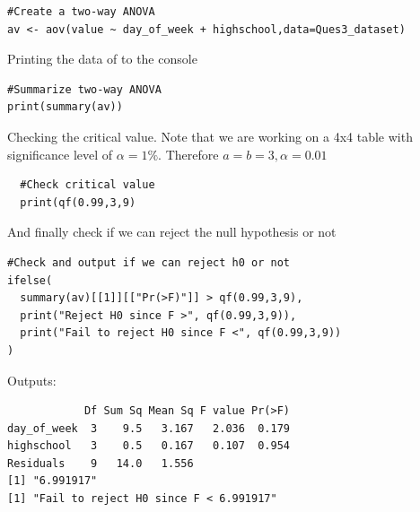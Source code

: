 \documentclass[a4paper]{article}
\numberwithin{equation}{section}
\begin{document}
\begin{mdframed}[leftline=false,rightline=false,backgroundcolor=magenta!10,nobreak=true]
  \begin{verbatim}
#Create a two-way ANOVA
av <- aov(value ~ day_of_week + highschool,data=Ques3_dataset)
    \end{verbatim}
\end{mdframed}

Printing the data of to the console

\begin{mdframed}[leftline=false,rightline=false,backgroundcolor=magenta!10,nobreak=true]
  \begin{verbatim}
#Summarize two-way ANOVA
print(summary(av))
    \end{verbatim}
\end{mdframed}

Checking the critical value. Note that we are working on a 4x4 table with significance level of \(\alpha = 1\%\). Therefore \(a = b = 3, \alpha = 0.01\)

\begin{mdframed}[leftline=false,rightline=false,backgroundcolor=magenta!10,nobreak=true]
  \begin{verbatim}
  #Check critical value
  print(qf(0.99,3,9)
    \end{verbatim}
\end{mdframed}

And finally check if we can reject the null hypothesis or not
\begin{mdframed}[leftline=false,rightline=false,backgroundcolor=magenta!10,nobreak=true]
  \begin{verbatim}
#Check and output if we can reject h0 or not
ifelse(
  summary(av)[[1]][["Pr(>F)"]] > qf(0.99,3,9),
  print("Reject H0 since F >", qf(0.99,3,9)),
  print("Fail to reject H0 since F <", qf(0.99,3,9))
)
  \end{verbatim}
\end{mdframed}

Outputs:
\begin{mdframed}[leftline=false,rightline=false,backgroundcolor=magenta!10,nobreak=true]
  \begin{verbatim}
            Df Sum Sq Mean Sq F value Pr(>F)
day_of_week  3    9.5   3.167   2.036  0.179
highschool   3    0.5   0.167   0.107  0.954
Residuals    9   14.0   1.556
[1] "6.991917"
[1] "Fail to reject H0 since F < 6.991917"
  \end{verbatim}
\end{mdframed}
\end{document}
